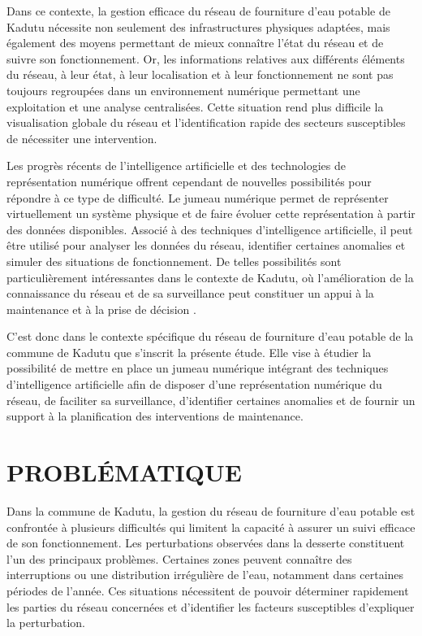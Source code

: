 Dans ce contexte, la gestion efficace du réseau de fourniture d'eau
potable de Kadutu nécessite non seulement des infrastructures physiques
adaptées, mais également des moyens permettant de mieux connaître
l'état du réseau et de suivre son fonctionnement. Or, les informations
relatives aux différents éléments du réseau, à leur état, à leur
localisation et à leur fonctionnement ne sont pas toujours regroupées
dans un environnement numérique permettant une exploitation et une
analyse centralisées. Cette situation rend plus difficile la
visualisation globale du réseau et l'identification rapide des secteurs
susceptibles de nécessiter une intervention.

Les progrès récents de l'intelligence artificielle et des technologies
de représentation numérique offrent cependant de nouvelles possibilités
pour répondre à ce type de difficulté. Le jumeau numérique permet de
représenter virtuellement un système physique et de faire évoluer cette
représentation à partir des données disponibles. Associé à des
techniques d'intelligence artificielle, il peut être utilisé pour
analyser les données du réseau, identifier certaines anomalies et
simuler des situations de fonctionnement. De telles possibilités sont
particulièrement intéressantes dans le contexte de Kadutu, où
l'amélioration de la connaissance du réseau et de sa surveillance peut
constituer un appui à la maintenance et à la prise de décision
\cite{ref9}.

C'est donc dans le contexte spécifique du réseau de fourniture d'eau
potable de la commune de Kadutu que s'inscrit la présente étude. Elle
vise à étudier la possibilité de mettre en place un jumeau numérique
intégrant des techniques d'intelligence artificielle afin de disposer
d'une représentation numérique du réseau, de faciliter sa surveillance,
d'identifier certaines anomalies et de fournir un support à la
planification des interventions de maintenance.


\section{PROBLÉMATIQUE}
\label{problematique}

Dans la commune de Kadutu, la gestion du réseau de fourniture d'eau
potable est confrontée à plusieurs difficultés qui limitent la capacité
à assurer un suivi efficace de son fonctionnement. Les perturbations
observées dans la desserte constituent l'un des principaux problèmes.
Certaines zones peuvent connaître des interruptions ou une distribution
irrégulière de l'eau, notamment dans certaines périodes de l'année.
Ces situations nécessitent de pouvoir déterminer rapidement les parties
du réseau concernées et d'identifier les facteurs susceptibles
d'expliquer la perturbation.

